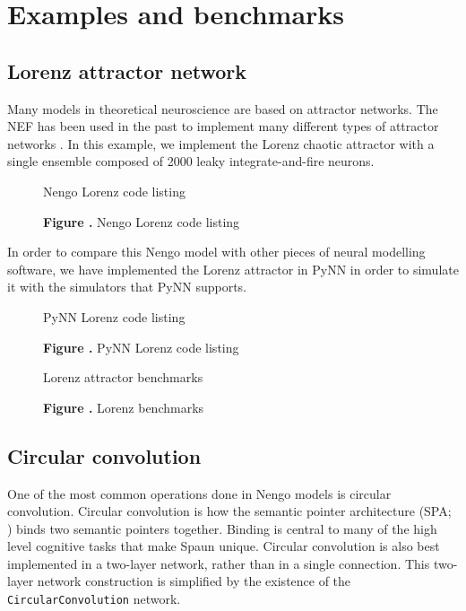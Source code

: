 \documentclass{frontiersSCNS}
\begin{document}
\section{Examples and benchmarks}

\subsection{Lorenz attractor network}

Many models in theoretical neuroscience
are based on attractor networks.
The NEF has been used in the past
to implement many different types of
attractor networks \cite{TODO}.
In this example,
we implement the Lorenz chaotic attractor
with a single ensemble
composed of 2000 leaky integrate-and-fire neurons.

\begin{figure}
\begin{center}
  Nengo Lorenz code listing
\end{center}
 \textbf{\label{fig:01} Figure .}{
   Nengo Lorenz code listing}
\end{figure}

In order to compare this Nengo model
with other pieces of neural modelling software,
we have implemented the Lorenz attractor
in PyNN \cite{TODO} in order to simulate it
with the simulators that PyNN supports.

\begin{figure}
\begin{center}
  PyNN Lorenz code listing
\end{center}
 \textbf{\label{fig:01} Figure .}{
   PyNN Lorenz code listing}
\end{figure}

\begin{figure}
\begin{center}
  Lorenz attractor benchmarks
\end{center}
 \textbf{\label{fig:01} Figure .}{
   Lorenz benchmarks}
\end{figure}

\subsection{Circular convolution}

One of the most common operations done
in Nengo models is circular convolution.
Circular convolution is how
the semantic pointer architecture
(SPA; \cite{TODO})
binds two semantic pointers together.
Binding is central to many
of the high level cognitive tasks
that make Spaun unique.
Circular convolution
is also best implemented in a two-layer network,
rather than in a single connection.
This two-layer network construction is simplified
by the existence of the \texttt{CircularConvolution} network.
\end{document}
